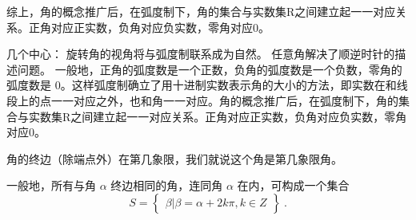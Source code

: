 综上，角的概念推广后，在弧度制下，角的集合与实数集R之间建立起一一对应关系。正角对应正实数，负角对应负实数，零角对应0。

几个中心：
旋转角的视角将与弧度制联系成为自然。
任意角解决了顺逆时针的描述问题。
一般地，正角的弧度数是一个正数，负角的弧度数是一个负数，零角的弧度数是 $0$。这样弧度制确立了用十进制实数表示角的大小的方法，即实数在和线段上的点一一对应之外，也和角一一对应。角的概念推广后，在弧度制下，角的集合与实数集R之间建立起一一对应关系。正角对应正实数，负角对应负实数，零角对应0。





角的终边（除端点外）在第几象限，我们就说这个角是第几象限角。

一般地，所有与角 $\alpha$ 终边相同的角，连同角 $\alpha$ 在内，可构成一个集合
\begin{equation}
S = \begin{Bmatrix} \beta|\beta=\alpha+2k\pi,k \in Z \end{Bmatrix}~.
\end{equation}


